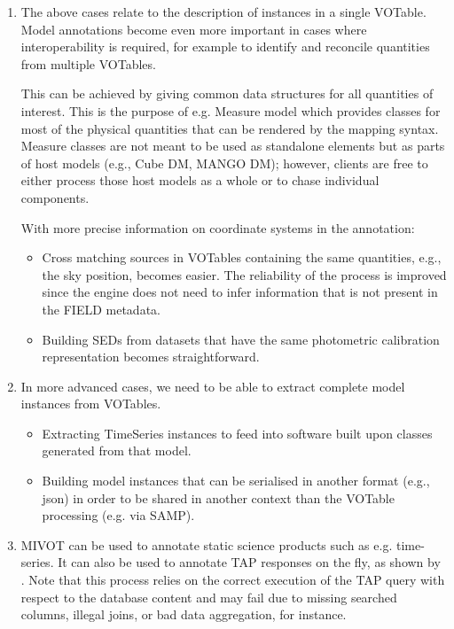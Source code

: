 \begin{enumerate}
  \item The above cases relate to the description of instances in a
  single VOTable. Model annotations become even more important in cases
  where interoperability is required, for example to identify and
  reconcile quantities from multiple VOTables.

  This can be achieved by giving  common data structures for all 
  quantities of interest. This is the purpose of e.g. Measure model 
  which provides classes for most of the physical quantities that can 
  be rendered by the mapping syntax. Measure classes are not meant to 
  be used as standalone elements but as parts of host models 
  (e.g., Cube DM, MANGO DM);
  however, clients are free to either process those host models as a
  whole or to chase individual components.
  
  With more precise information on coordinate systems in the annotation:
    \begin{itemize}
      \item Cross matching sources in VOTables containing the same
      quantities, e.g., the sky position, becomes easier.
            The reliability of the process is improved since the engine does not need to infer information that is not present in the FIELD metadata.
      \item Building SEDs from datasets that have the same photometric calibration representation becomes straightforward.
   \end{itemize}          

  \item In more advanced cases, we need to be able to extract complete model instances from VOTables.
    \begin{itemize}
      \item Extracting  TimeSeries instances to feed into software built upon classes generated from that model.
      \item Building model instances that can be serialised in another
      format (e.g., json) in order to be shared in another context than 
            the VOTable processing (e.g. via SAMP).
   \end{itemize}         
    
   \item MIVOT can be used to annotate static science products such as e.g. time-series. It can also be used to annotate 
    TAP responses on the fly, as shown by \cite{2201.01732}. Note that this process relies on the correct execution of the TAP query 
    with respect to the database content and may fail due to missing searched columns, illegal joins, or bad data aggregation, for instance. 
   
    
\end{enumerate} 

